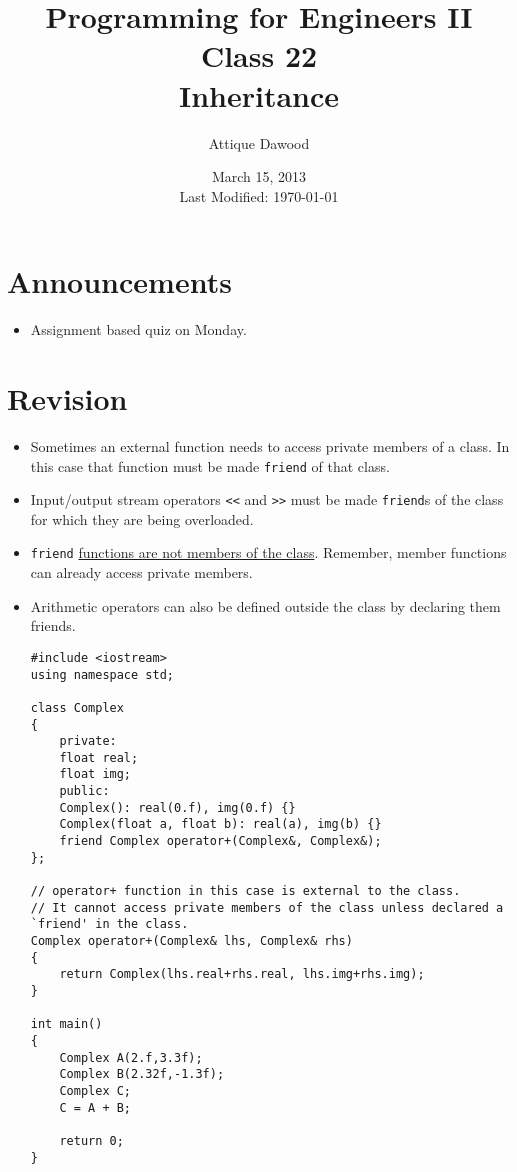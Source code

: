 \documentclass[12pt,a4paper]{article}
\title{\vspace{-2cm}Programming for Engineers II\\Class 22\\Inheritance}
\author{Attique Dawood}
\date{March 15, 2013\\[0.2cm] Last Modified: \today}
\begin{document}
\maketitle
\section{Announcements}
\begin{itemize}
\item Assignment based quiz on Monday.
\end{itemize}
\section{Revision}
\begin{itemize}
\item Sometimes an external function needs to access private members of a class. In this case that function must be made \verb|friend| of that class.
\item Input/output stream operators \verb|<<| and \verb|>>| must be made \verb|friend|s of the class for which they are being overloaded.
\item \verb|friend| \underline{functions are not members of the class}. Remember, member functions can already access private members.
\item Arithmetic operators can also be defined outside the class by declaring them friends.
\begin{lstlisting}[caption={operator+ implemented as \texttt{friend}}]
#include <iostream>
using namespace std;

class Complex
{
	private:
	float real;
	float img;
	public:
	Complex(): real(0.f), img(0.f) {}
	Complex(float a, float b): real(a), img(b) {}
	friend Complex operator+(Complex&, Complex&);
};

// operator+ function in this case is external to the class.
// It cannot access private members of the class unless declared a `friend' in the class.
Complex operator+(Complex& lhs, Complex& rhs)
{
	return Complex(lhs.real+rhs.real, lhs.img+rhs.img);
}

int main()
{
	Complex A(2.f,3.3f);
	Complex B(2.32f,-1.3f);
	Complex C;
	C = A + B;

	return 0;
}
\end{lstlisting}
\end{itemize}
\end{document}
